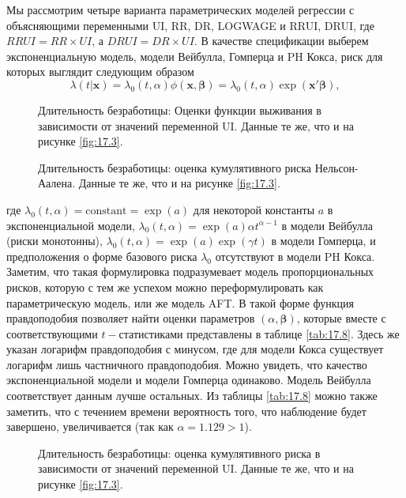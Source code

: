 Мы рассмотрим четыре варианта параметрических моделей регрессии с объясняющими переменными UI, RR, DR, LOGWAGE и RRUI, DRUI, где $RRUI = RR \times UI$, а $DRUI = DR \times UI$. В качестве спецификации выберем экспоненциальную модель, модели Вейбулла, Гомперца и PH Кокса, риск для которых выглядит следующим образом
        $$\lambda(t|\mathbf{x})=\lambda_0(t,\alpha)\phi(\mathbf{x},\bm{\beta})=\lambda_0(t,\alpha)\exp(\mathbf{x}'\bm{\beta}),$$
    \begin{figure}[ht!]\caption{Длительность безработицы: Оценки функции выживания в зависимости от значений переменной UI. Данные те же, что и на рисунке \ref{fig:17.3}.}\label{fig:17.4}
    \centering
    \end{figure}
    \begin{figure}[ht!]\caption{Длительность безработицы: оценка кумулятивного риска Нельсон-Аалена. Данные те же, что и на рисунке \ref{fig:17.3}.}\label{fig:17.5}
    \centering
    \end{figure}
где $\lambda_0(t,\alpha)=\textrm{constant}=\exp(a)$ для некоторой константы $a$ в экспоненциальной модели, $\lambda_0(t,\alpha)=\exp(a)\alpha t^{\alpha-1}$ в модели Вейбулла (риски монотонны), $\lambda_0(t,\alpha)=\exp(a)\exp(\gamma t)$ в модели Гомперца, и предположения о форме базового риска $\lambda_0$ отсутствуют в модели PH Кокса. Заметим, что такая формулировка подразумевает модель пропорциональных рисков, которую с тем же успехом можно переформулировать как параметрическую модель, или же модель AFT. В такой форме функция правдоподобия позволяет найти оценки параметров $(\alpha,\bm{\beta})$, которые вместе с соответствующими $t-$статистиками представлены в таблице \ref{tab:17.8}. Здесь же указан логарифм правдоподобия с минусом, где для модели Кокса существует логарифм лишь частничного правдоподобия. Можно увидеть, что качество экспоненциальной модели и модели Гомперца одинаково. Модель Вейбулла соответствует данным лучше остальных. Из таблицы \ref{tab:17.8} можно также заметить, что с течением времени вероятность того, что наблюдение будет завершено, увеличивается (так как $\alpha=1.129>1$).

\begin{figure}[ht!]\caption{Длительность безработицы: оценка кумулятивного риска в зависимости от значений переменной UI. Данные те же, что и на рисунке \ref{fig:17.3}.}\label{fig:17.6}
\centering
\end{figure}

